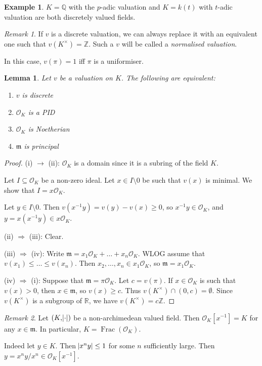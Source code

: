 \documentclass[11pt]{article}
\theoremstyle{definition}
\newtheorem*{example}{Example}
\theoremstyle{plain}
\newtheorem{lemma}[definition]{Lemma}
\theoremstyle{remark}
\newtheorem*{remark}{Remark}
\DeclareMathOperator{\Frac}{Frac}
\newcommand{\bZ}{\mathbb{Z}}
\newcommand{\bQ}{\mathbb{Q}}
\newcommand{\bR}{\mathbb{R}}
\newcommand{\cO}{\mathcal{O}}
\newcommand{\fm}{\mathfrak{m}}
\begin{document}
\begin{example}
    $K = \bQ$ with the $p$-adic valuation and $K = k(t)$ with $t$-adic valuation are both discretely valued fields.
\end{example}

\begin{remark}
    If $v$ is a discrete valuation, we can always replace it with an equivalent one such that $v(K^\times) = \bZ$. Such a $v$ will be called a \emph{normalised valuation}.

    In this case, $v(\pi) = 1$ iff $\pi$ is a uniformiser.
\end{remark}

\begin{lemma}\label{lem:2_6}
    Let $v$ be a valuation on $K$. The following are equivalent:
    \begin{enumerate}
        \item $v$ is discrete
        \item $\cO_K$ is a PID
        \item $\cO_K$ is Noetherian
        \item $\fm$ is principal
    \end{enumerate}
\end{lemma}
\begin{proof}
    (i) $\rightarrow$ (ii): $\cO_K$ is a domain since it is a subring of the field $K$.

    Let $I \subseteq \cO_K$ be a non-zero ideal. Let $x \in I \setminus 0$ be such that $v(x)$ is minimal. We show that $I = x \cO_K$.

    Let $y \in I \setminus 0$. Then $v(x^{-1} y) = v(y) - v(x) \ge 0$, so $x^{-1} y \in \cO_K$, and $y = x(x^{-1} y) \in x \cO_K$.

    \noindent (ii) $\Rightarrow$ (iii): Clear.

    \noindent (iii) $\Rightarrow$ (iv): Write $\fm = x_1 \cO_K + \ldots + x_n \cO_K$. WLOG assume that $v(x_1) \le \ldots \le v(x_n)$. Then $x_2, \ldots, x_n \in x_1 \cO_K$, so $\fm = x_1 \cO_K$.

    \noindent (iv) $\Rightarrow$ (i): Suppose that $\fm = \pi \cO_K$. Let $c = v(\pi)$. If $x \in \cO_K$ is such that $v(x) > 0$, then $x \in \fm$, so $v(x) \ge c$. Thus $v(K^\times) \cap (0, c) = \emptyset$. Since $v(K^\times)$ is a subgroup of $\bR$, we have $v(K^\times) = c \bZ$.
\end{proof}

\begin{remark}
    Let $(K, \abs{\cdot})$ be a non-archimedean valued field. Then $\cO_K[x^{-1}] = K$ for any $x \in \fm$. In particular, $K = \Frac(\cO_K)$.

    Indeed let $y \in K$. Then $\abs{x^n y} \le 1$ for some $n$ sufficiently large. Then $y = x^n y / x^n \in \cO_K[x^{-1}]$.
\end{remark}
\end{document}
